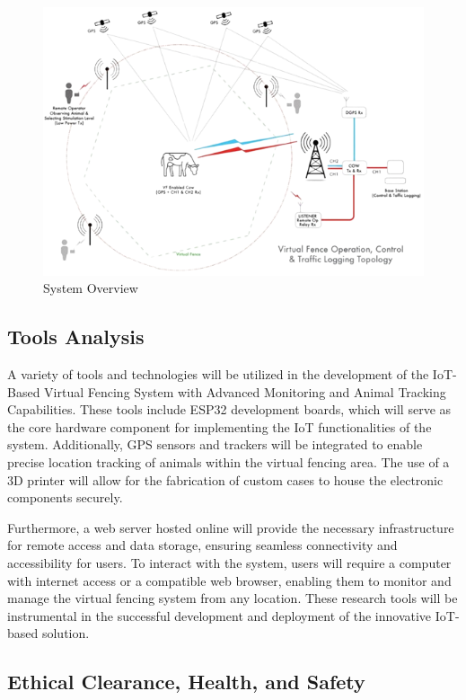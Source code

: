 \documentclass[conference]{main}
\begin{document}
\begin{figure}[htbp]
\centering
\includegraphics[width=\columnwidth]{system-removebg-preview.png}
\caption{System Overview}
\label{fig}
\end{figure}

\subsection{Tools Analysis}

A variety of tools and technologies will be utilized in the
development of the IoT-Based Virtual Fencing System with Advanced Monitoring and
Animal Tracking Capabilities. These tools include ESP32 development boards,
which will serve as the core hardware component for implementing the IoT
functionalities of the system. Additionally, GPS sensors and trackers will be
integrated to enable precise location tracking of animals within the virtual
fencing area. The use of a 3D printer will allow for the fabrication of custom
cases to house the electronic components securely.

Furthermore, a web server hosted online will provide the necessary
infrastructure for remote access and data storage, ensuring seamless
connectivity and accessibility for users. To interact with the system, users
will require a computer with internet access or a compatible web browser,
enabling them to monitor and manage the virtual fencing system from any
location. These research tools will be instrumental in the successful
development and deployment of the innovative IoT-based solution.

\subsection{Ethical Clearance, Health, and Safety}
\end{document}
